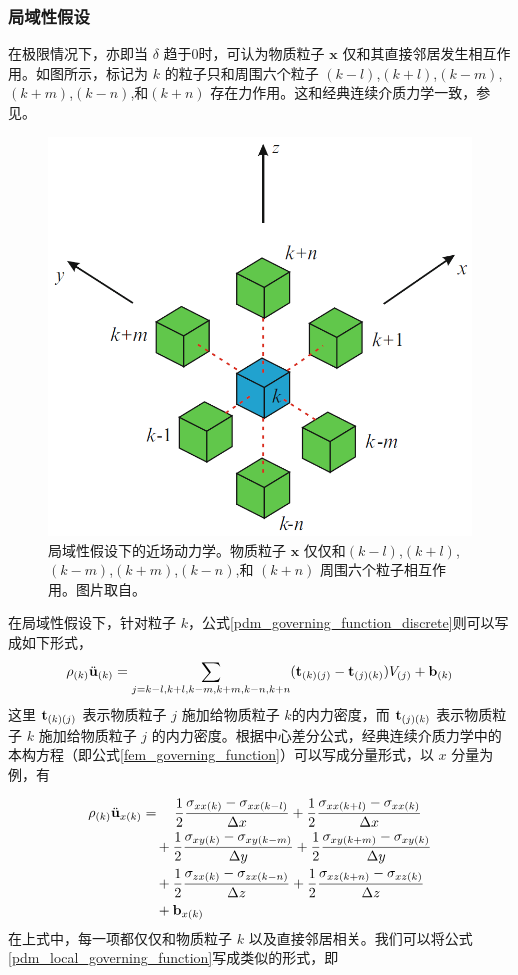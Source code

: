 \subsubsection{局域性假设}
在极限情况下，亦即当 $\delta$ 趋于0时，可认为物质粒子 $\mathbf{x}$ 仅和其直接邻居发生相互作用。如图所示，标记为 $k$ 的粒子只和周围六个粒子 $(k-l)$,$(k+l)$,$(k-m)$,$(k+m)$,$(k-n)$,和$(k+n)$ 存在力作用。这和经典连续介质力学一致，参见。

\begin{figure}[htbp!]
  \centering
  \captionsetup{justification=centering}
  \includegraphics[width=0.5\linewidth]{chap/image/pdm_local}

  \caption{\label{pdm_local}
           局域性假设下的近场动力学。物质粒子 $\mathbf{x}$ 仅仅和$(k-l)$,$(k+l)$,$(k-m)$,$(k+m)$,$(k-n)$,和 $(k+n)$ 周围六个粒子相互作用。图片取自。
          }
\end{figure}

在局域性假设下，针对粒子 $k$，公式\ref{pdm_governing_function_discrete}则可以写成如下形式，
\begin{equation}
\rho_{(k)}\ddot{\mathbf{u}}_{(k)}
= \sum_{j=k-l,k+l,k-m,k+m,k-n,k+n}(\mathbf{t}_{(k)(j)}-\mathbf{t}_{(j)(k)})V_{(j)} + \mathbf{b}_{(k)}
\label{pdm_local_governing_function}
\end{equation}
这里 $\mathbf{t}_{(k)(j)}$ 表示物质粒子 $j$ 施加给物质粒子 $k$的内力密度，而 $\mathbf{t}_{(j)(k)}$ 表示物质粒子 $k$ 施加给物质粒子 $j$ 的内力密度。根据中心差分公式，经典连续介质力学中的本构方程（即公式\ref{fem_governing_function}）可以写成分量形式，以 $x$ 分量为例，有

\begin{equation}
\begin{aligned}
\rho_{(k)}\ddot{\mathbf{u}}_{x(k)} &= \quad \frac{1}{2}\frac{\sigma_{xx(k)} - \sigma_{xx(k-l)}}{\Delta x} + \frac{1}{2}\frac{\sigma_{xx(k+l)} - \sigma_{xx(k)}}{\Delta x}\\
                              &\quad+  \frac{1}{2}\frac{\sigma_{xy(k)} - \sigma_{xy(k-m)}}{\Delta y} + \frac{1}{2}\frac{\sigma_{xy(k+m)} - \sigma_{xy(k)}}{\Delta y}\\
                              &\quad+  \frac{1}{2}\frac{\sigma_{zx(k)} - \sigma_{zx(k-n)}}{\Delta z} + \frac{1}{2}\frac{\sigma_{xz(k+n)} - \sigma_{xz(k)}}{\Delta z}\\
                              &\quad + \mathbf{b}_{x(k)}
\label{fem_local_governing_function}
\end{aligned}
\end{equation}
在上式中，每一项都仅仅和物质粒子 $k$ 以及直接邻居相关。我们可以将公式\ref{pdm_local_governing_function}写成类似的形式，即


